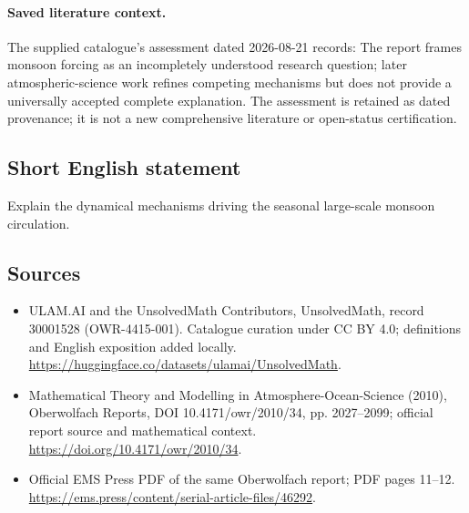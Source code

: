 \documentclass[11pt]{article}
\begin{document}
\paragraph{Saved literature context.} The supplied catalogue's assessment dated 2026-08-21 records: The report frames monsoon forcing as an incompletely understood research question; later atmospheric-science work refines competing mechanisms but does not provide a universally accepted complete explanation. The assessment is retained as dated provenance; it is not a new comprehensive literature or open-status certification.
\subsection{Short English statement}
Explain the dynamical mechanisms driving the seasonal large-scale monsoon circulation.
\subsection{Sources}
\begin{itemize}
\item[\hypertarget{source:30001528:1}{S1}] ULAM.AI and the UnsolvedMath Contributors, UnsolvedMath, record 30001528 (OWR-4415-001). Catalogue curation under CC BY 4.0; definitions and English exposition added locally.
\url{https://huggingface.co/datasets/ulamai/UnsolvedMath}.
\item[\hypertarget{source:30001528:2}{S2}] Mathematical Theory and Modelling in Atmosphere-Ocean-Science (2010), Oberwolfach Reports, DOI 10.4171/owr/2010/34, pp. 2027--2099; official report source and mathematical context.
\url{https://doi.org/10.4171/owr/2010/34}.
\item[\hypertarget{source:30001528:3}{S3}] Official EMS Press PDF of the same Oberwolfach report; PDF pages 11--12.
\url{https://ems.press/content/serial-article-files/46292}.
\end{itemize}
\label{end:30001528}
\end{document}
